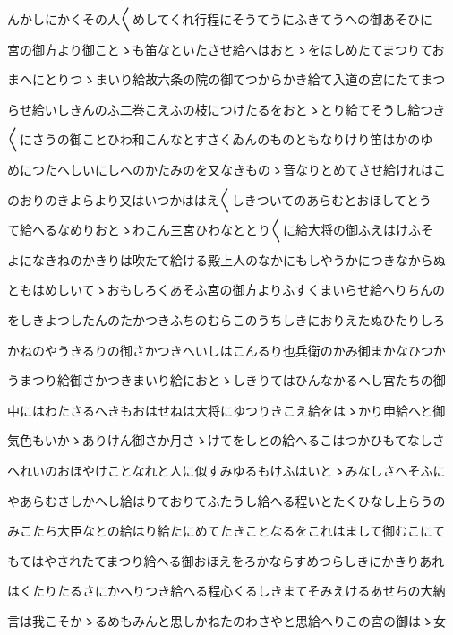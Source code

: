 \documentclass[a4paper,11pt,landscape]{ltjtarticle}
\begin{document}
\par\medskip
んかしにかくその人〱めしてくれ行程にそうてうにふきてうへの御あそひに
\par\medskip
宮の御方より御ことゝも笛なといたさせ給へはおとゝをはしめたてまつりてお
\par\medskip
まへにとりつゝまいり給故六条の院の御てつからかき給て入道の宮にたてまつ
\par\medskip
らせ給いしきんのふ二巻こえふの枝につけたるをおとゝとり給てそうし給つき
\par\medskip
〱にさうの御ことひわ和こんなとすさくゐんのものともなりけり笛はかのゆ
\par\medskip
めにつたへしいにしへのかたみのを又なきものゝ音なりとめてさせ給けれはこ
\par\medskip
のおりのきよらより又はいつかははえ〱しきついてのあらむとおほしてとう
\par\medskip
て給へるなめりおとゝわこん三宮ひわなととり〱に給大将の御ふえはけふそ
\par\medskip
よになきねのかきりは吹たて給ける殿上人のなかにもしやうかにつきなからぬ
\par\medskip
ともはめしいてゝおもしろくあそふ宮の御方よりふすくまいらせ給へりちんの
\par\medskip
をしきよつしたんのたかつきふちのむらこのうちしきにおりえたぬひたりしろ
\par\medskip
かねのやうきるりの御さかつきへいしはこんるり也兵衛のかみ御まかなひつか
\par\medskip
うまつり給御さかつきまいり給におとゝしきりてはひんなかるへし宮たちの御
\par\medskip
中にはわたさるへきもおはせねは大将にゆつりきこえ給をはゝかり申給へと御
\par\medskip
気色もいかゝありけん御さか月さゝけてをしとの給へるこはつかひもてなしさ
\par\medskip
へれいのおほやけことなれと人に似すみゆるもけふはいとゝみなしさへそふに
\par\medskip
やあらむさしかへし給はりておりてふたうし給へる程いとたくひなし上らうの
\par\medskip
みこたち大臣なとの給はり給たにめてたきことなるをこれはまして御むこにて
\par\medskip
もてはやされたてまつり給へる御おほえをろかならすめつらしきにかきりあれ
\par\medskip
はくたりたるさにかへりつき給へる程心くるしきまてそみえけるあせちの大納
\par\medskip
言は我こそかゝるめもみんと思しかねたのわさやと思給へりこの宮の御はゝ女
\par\medskip
\end{document}
